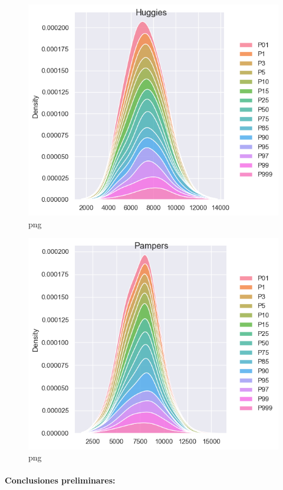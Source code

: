 \documentclass[
]{article}
\begin{document}
\begin{figure}
\centering
\includegraphics{output_40_0.png}
\caption{png}
\end{figure}

\begin{figure}
\centering
\includegraphics{output_40_1.png}
\caption{png}
\end{figure}

\hypertarget{conclusiones-preliminares-1}{%
\paragraph{Conclusiones
preliminares:}\label{conclusiones-preliminares-1}}
\end{document}
